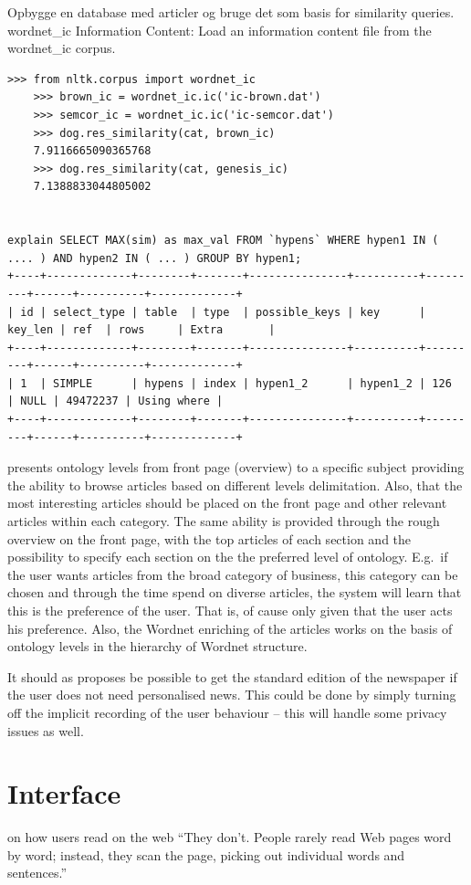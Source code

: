 Opbygge en database med articler og bruge det som basis for similarity queries.
wordnet\_ic Information Content: Load an information content file from the wordnet\_ic corpus.
\begin{lstlisting}[caption=cap,label=lst:lab,float=htbp]
	>>> from nltk.corpus import wordnet_ic
	>>> brown_ic = wordnet_ic.ic('ic-brown.dat')
	>>> semcor_ic = wordnet_ic.ic('ic-semcor.dat')
	>>> dog.res_similarity(cat, brown_ic)
	7.9116665090365768
	>>> dog.res_similarity(cat, genesis_ic)
	7.1388833044805002


explain SELECT MAX(sim) as max_val FROM `hypens` WHERE hypen1 IN ( .... ) AND hypen2 IN ( ... ) GROUP BY hypen1;
+----+-------------+--------+-------+---------------+----------+---------+------+----------+-------------+
| id | select_type | table  | type  | possible_keys | key      | key_len | ref  | rows     | Extra       |
+----+-------------+--------+-------+---------------+----------+---------+------+----------+-------------+
| 1  | SIMPLE      | hypens | index | hypen1_2      | hypen1_2 | 126     | NULL | 49472237 | Using where |
+----+-------------+--------+-------+---------------+----------+---------+------+----------+-------------+
\end{lstlisting}


\cite{21172_ftp.pdf} presents ontology levels from front page (overview) to a specific subject providing the ability to browse articles based on different levels delimitation. Also, that the most interesting articles should be placed on the front page and other relevant articles within each category. The same ability is provided through the rough overview on the front page, with the top articles of each section and the possibility to specify each section on the the preferred level of ontology. E.g.\ if the user wants articles from the broad category of business, this category can be chosen and through the time spend on diverse articles, the system will learn that this is the preference of the user. That is, of cause only given that the user acts his preference. Also, the Wordnet enriching of the articles works on the basis of ontology levels in the hierarchy of Wordnet structure.

It should as \cite{21172_ftp.pdf} proposes be possible to get the standard edition of the newspaper if the user does not need personalised news. This could be done by simply turning off the implicit recording of the user behaviour -- this will handle some privacy issues as well.

\section{Interface}
\cite{NielsenWeb} on how users read on the web ``They don't. People rarely read Web pages word by word; instead, they scan the page, picking out individual words and sentences.''

